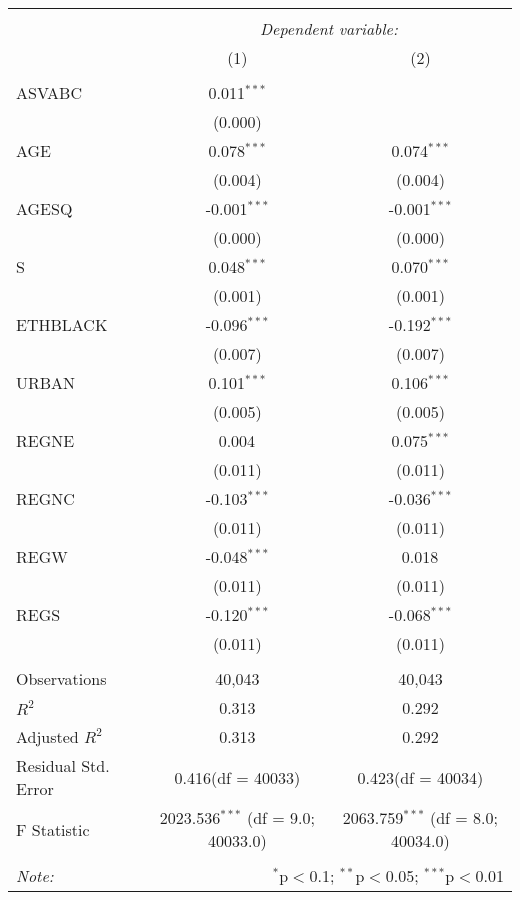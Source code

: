 \begin{table}[!htbp] \centering
\begin{tabular}{@{\extracolsep{5pt}}lcc}
\\[-1.8ex]\hline
\hline \\[-1.8ex]
& \multicolumn{2}{c}{\textit{Dependent variable:}} \
\cr \cline{2-3}
\\[-1.8ex] & (1) & (2) \\
\hline \\[-1.8ex]
 ASVABC & 0.011$^{***}$ & \\
  & (0.000) & \\
 AGE & 0.078$^{***}$ & 0.074$^{***}$ \\
  & (0.004) & (0.004) \\
 AGESQ & -0.001$^{***}$ & -0.001$^{***}$ \\
  & (0.000) & (0.000) \\
 S & 0.048$^{***}$ & 0.070$^{***}$ \\
  & (0.001) & (0.001) \\
 ETHBLACK & -0.096$^{***}$ & -0.192$^{***}$ \\
  & (0.007) & (0.007) \\
 URBAN & 0.101$^{***}$ & 0.106$^{***}$ \\
  & (0.005) & (0.005) \\
 REGNE & 0.004$^{}$ & 0.075$^{***}$ \\
  & (0.011) & (0.011) \\
 REGNC & -0.103$^{***}$ & -0.036$^{***}$ \\
  & (0.011) & (0.011) \\
 REGW & -0.048$^{***}$ & 0.018$^{}$ \\
  & (0.011) & (0.011) \\
 REGS & -0.120$^{***}$ & -0.068$^{***}$ \\
  & (0.011) & (0.011) \\
\hline \\[-1.8ex]
 Observations & 40,043 & 40,043 \\
 $R^2$ & 0.313 & 0.292 \\
 Adjusted $R^2$ & 0.313 & 0.292 \\
 Residual Std. Error & 0.416(df = 40033) & 0.423(df = 40034)  \\
 F Statistic & 2023.536$^{***}$ (df = 9.0; 40033.0) & 2063.759$^{***}$ (df = 8.0; 40034.0) \\
\hline
\hline \\[-1.8ex]
\textit{Note:} & \multicolumn{2}{r}{$^{*}$p$<$0.1; $^{**}$p$<$0.05; $^{***}$p$<$0.01} \\
\end{tabular}
\end{table}